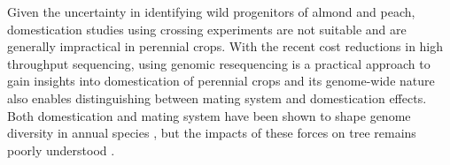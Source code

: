 \documentclass[12pt]{article}
\begin{document}
%
Given the uncertainty in identifying wild progenitors of almond and peach, domestication studies using crossing experiments are not suitable and are generally impractical in perennial crops.
%
With the recent cost reductions in high throughput sequencing, using genomic resequencing is a practical approach to gain insights into domestication of perennial crops and its genome-wide nature also enables distinguishing between mating system and domestication effects. 
%
Both domestication and mating system have been shown to shape genome diversity in annual species \citep{glemin2006impact, doebley2006molecular, slotte2013capsella}, but the impacts of these forces on tree remains poorly understood \citep{mckey2010evolutionary, miller2011forest}.
\end{document}
